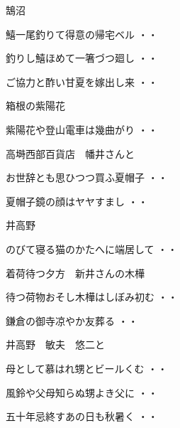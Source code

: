 \vspace{0.6cm}
鵠沼
\begin{shiika}鱚一尾釣りて得意の帰宅ベル
\hfill{・・}\end{shiika}
\begin{shiika}釣りし鱚ほめて一箸づつ廻し
\hfill{・・}\end{shiika}
\begin{shiika}ご協力と酢い甘夏を嫁出し来
\hfill{・・}\end{shiika}
\vspace{0.6cm}
箱根の紫陽花
\begin{shiika}紫陽花や登山電車は幾曲がり
\hfill{・・}\end{shiika}
\vspace{0.6cm}
高塒西部百貨店　幡井さんと
\begin{shiika}お世辞とも思ひつつ買ふ夏帽子
\hfill{・・}\end{shiika}
\begin{shiika}夏帽子鏡の顔はヤヤすまし
\hfill{・・}\end{shiika}
\vspace{0.6cm}
井高野
\begin{shiika}のびて寝る猫のかたへに端居して
\hfill{・・}\end{shiika}
\vspace{0.6cm}
着荷待つ夕方　新井さんの木樺
\begin{shiika}待つ荷物おそし木樺はしぼみ初む
\hfill{・・}\end{shiika}
\vspace{0.6cm}
\begin{shiika}鎌倉の御寺凉やか友葬る
\hfill{・・}\end{shiika}
\vspace{0.6cm}
井高野　敏夫　悠二と
\begin{shiika}母として慕はれ甥とビールくむ
\hfill{・・}\end{shiika}
\begin{shiika}風鈴や父母知らぬ甥よき父に
\hfill{・・}\end{shiika}
\begin{shiika}五十年忌終すあの日も秋暑く
\hfill{・・}\end{shiika}
